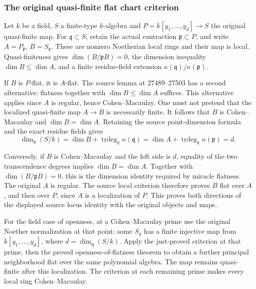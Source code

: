 \subsubsection{The original quasi-finite flat chart criterion}\label{the-original-quasi-finite-flat-chart-criterion}

Let \(k\) be a field, \(S\) a finite-type \(k\)-algebra and \(P=k[y_1,\ldots,y_d]\to S\) the original quasi-finite map. For \(\mathfrak q\subset S\), retain the actual contraction \(\mathfrak p\subset P\), and write \(A=P_{\mathfrak p}\), \(B=S_{\mathfrak q}\). These are nonzero Noetherian local rings and their map is local. Quasi-finiteness gives \(\dim(B/\mathfrak pB)=0\), the dimension inequality \(\dim B\leq\dim A\), and a finite residue-field extension \(\kappa(\mathfrak q)/\kappa(\mathfrak p)\).

If \(B\) is \(P\)-flat, it is \(A\)-flat. The source lemma at 27489--27503 has a second alternative: flatness together with \(\dim B\leq\dim A\) suffices. This alternative applies since \(A\) is regular, hence Cohen--Macaulay. One must not pretend that the localized quasi-finite map \(A\to B\) is necessarily finite. It follows that \(B\) is Cohen--Macaulay and \(\dim B=\dim A\). Retaining the source point-dimension formula and the exact residue fields gives \[
\dim_{\mathfrak q}(S/k)
=\dim B+\operatorname{trdeg}_k\kappa(\mathfrak q)
=\dim A+\operatorname{trdeg}_k\kappa(\mathfrak p)=d.
\]

Conversely, if \(B\) is Cohen--Macaulay and the left side is \(d\), equality of the two transcendence degrees implies \(\dim B=\dim A\). Together with \(\dim(B/\mathfrak pB)=0\), this is the dimension identity required by miracle flatness. The original \(A\) is regular. The source local criterion therefore proves \(B\) flat over \(A\), and then over \(P\), since \(A\) is a localization of \(P\). This proves both directions of the displayed source locus identity with the original objects and maps.

For the field case of openness, at a Cohen--Macaulay prime use the original Noether normalization at that point: some \(S_g\) has a finite injective map from \(k[y_1,\ldots,y_d]\), where \(d=\dim_{\mathfrak q}(S/k)\). Apply the just-proved criterion at that prime, then the proved openness-of-flatness theorem to obtain a further principal neighborhood flat over the same polynomial algebra. The map remains quasi-finite after this localization. The criterion at each remaining prime makes every local ring Cohen--Macaulay.

